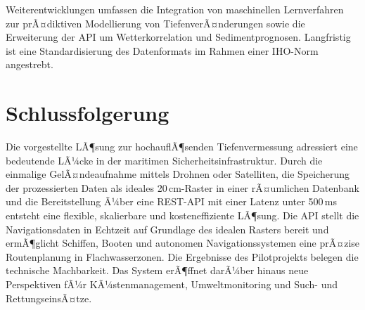 ﻿\documentclass[a4paper,12pt]{article}
\theoremstyle{definition}
\begin{document}
Weiterentwicklungen umfassen die Integration von maschinellen Lernverfahren zur
prÃ¤dikti\-ven Modellierung von TiefenverÃ¤nderungen sowie die Erweiterung der API um
Wetterkorrelation und Sedimentprognosen. Langfristig ist eine Standardisierung des
Datenformats im Rahmen einer IHO-Norm angestrebt.

\section{Schlussfolgerung}

Die vorgestellte LÃ¶sung zur hochauflÃ¶senden Tiefenvermessung adressiert eine bedeutende
LÃ¼cke in der maritimen Sicherheitsinfrastruktur. Durch die einmalige GelÃ¤ndeaufnahme
mittels Drohnen oder Satelliten, die Speicherung der prozessierten Daten als ideales
20\,cm-Raster in einer rÃ¤umlichen Datenbank und die Bereitstellung Ã¼ber eine REST-API
mit einer Latenz unter 500\,ms entsteht eine flexible, skalierbare und kosteneffiziente
LÃ¶sung. Die API stellt die Navigationsdaten in Echtzeit auf Grundlage des idealen Rasters
bereit und ermÃ¶glicht Schiffen, Booten und autonomen Navigations\-systemen eine
prÃ¤zise Routenplanung in Flachwasserzonen. Die Ergebnisse des Pilotprojekts belegen
die technische Machbarkeit. Das System erÃ¶ffnet darÃ¼ber hinaus neue Perspektiven fÃ¼r
KÃ¼stenmanagement, Umweltmonitoring und Such- und RettungseinsÃ¤tze.

\end{document}
